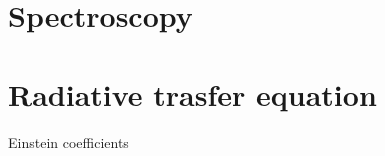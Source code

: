 \section{Spectroscopy}

\section{Radiative trasfer equation}

\begin{frame}{Einstein coefficients}
    
\end{frame}